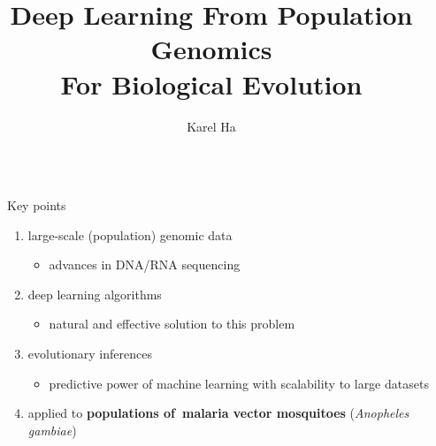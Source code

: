 \documentclass[final,hyperref={pdfpagelabels=false}]{beamer}
\title{\huge Deep Learning
From Population Genomics \\
For Biological Evolution} %
\author{Karel Ha} %
\institute{
Life Sciences -- Faculty of Natural Sciences\\
Imperial College London} %
\begin{document}

\begin{frame}[t] %

\begin{columns}[t] %

\begin{column}{.02\textwidth}\end{column} %

\begin{column}{.465\textwidth} %


\begin{block}{Key points}
\begin{enumerate}
    \item large-scale (population) genomic data
    \begin{itemize}
        \item advances in DNA/RNA sequencing
    \end{itemize}
    
    \item deep learning algorithms
    \begin{itemize}
        \item natural and effective solution to this problem
    \end{itemize}
    
    \item evolutionary inferences
    \begin{itemize}
        \item  predictive power of machine learning with scalability to large datasets
    \end{itemize}
    
    \item applied to \textbf{populations of~malaria vector mosquitoes} (\emph{Anopheles gambiae})
\end{enumerate}

\end{block}


\end{column}
\end{columns}
\end{frame}
\end{document}
